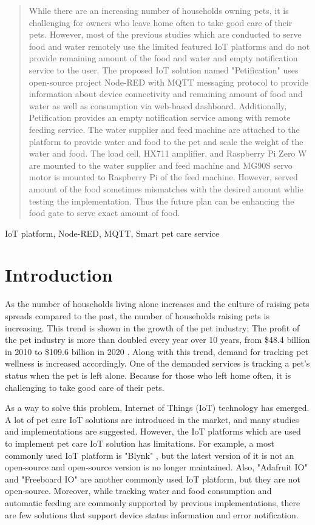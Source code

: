 \documentclass[conference]{IEEEtran}
\begin{document}
\begin{abstract}
While there are an increasing number of households owning pets, it is challenging for owners who leave home often to take good care of their pets. However, most of the previous studies which are conducted to serve food and water remotely use the limited featured IoT platforms and do not provide remaining amount of the food and water and empty notification service to the user. The proposed IoT solution named "Petification" uses open-source project Node-RED with MQTT messaging protocol to provide information about device connectivity and remaining amount of food and water as well as consumption via web-based dashboard. Additionally, Petification provides an empty notification service among with remote feeding service. The water supplier and feed machine are attached to the platform to provide water and food to the pet and scale the weight of the water and food. The load cell, HX711 amplifier, and Raspberry Pi Zero W are mounted to the water supplier and feed machine and MG90S servo motor is mounted to Raspberry Pi of the feed machine. However, served amount of the food sometimes mismatches with the desired amount whlie testing the implementation. Thus the future plan can be enhancing the food gate to serve exact amount of food. \\
\end{abstract}

\begin{IEEEkeywords}
IoT platform, Node-RED, MQTT, Smart pet care service 
\end{IEEEkeywords}

\section{Introduction}
As the number of households living alone increases and the culture of raising pets spreads compared to the past, the number of households raising pets is increasing. This trend is shown in the growth of the pet industry; The profit of the pet industry is more than doubled every year over 10 years, from \$48.4 billion in 2010 to \$109.6 billion in 2020 \cite{b1}. Along with this trend, demand for tracking pet wellness is increased accordingly. One of the demanded services is tracking a pet’s status when the pet is left alone. Because for those who left home often, it is challenging to take good care of their pets.

As a way to solve this problem, Internet of Things (IoT) technology has emerged. A lot of pet care IoT solutions are introduced in the market, and many studies and implementations are suggested.
However, the IoT platforms which are used to implement pet care IoT solution has limitations. For example, a most commonly used IoT platform is "Blynk" \cite{b2, b3, b4, b5}, but the latest version of it is not an open-source and open-source version is no longer maintained. Also, "Adafruit IO" \cite{b6} and "Freeboard IO" \cite{b7} are another commonly used IoT platform, but they are not open-source.
Moreover, while tracking water and food consumption and automatic feeding are commonly supported by previous implementations, there are few solutions that support device status information and error notification.
\end{document}
